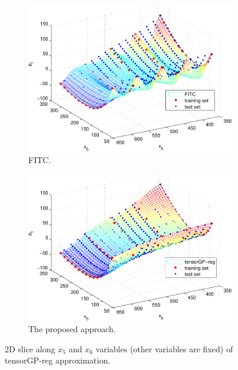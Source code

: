 \begin{figure}
  \centering
  \begin{subfigure}[b]{0.45\textwidth}
      \includegraphics[width=\textwidth]{figures/gp_on_grid/rotating_disk_fitc.pdf}
      \caption{FITC.}
      \label{fig:rotating_disc_originalGP}
  \end{subfigure}
  \begin{subfigure}[b]{0.45\textwidth}
      \includegraphics[width=\textwidth]{figures/gp_on_grid/rotating_disk_tensorGP.pdf}
      \caption{The proposed approach.}
      \label{fig:rotating_disc_tensorGP}
  \end{subfigure}
  \caption{2D slice along $x_5$ and $x_6$ variables (other variables are fixed) of tensorGP-reg approximation.}
\end{figure}

